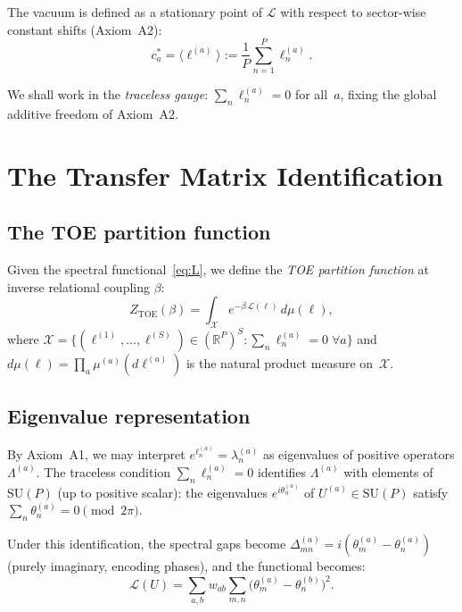 \documentclass[12pt]{article}
\theoremstyle{definition}
\theoremstyle{remark}
\newcommand{\SU}{\mathrm{SU}}
\newcommand{\TOE}{\mathrm{TOE}}
\begin{document}
The vacuum is defined as a stationary point of $\mathcal{L}$
with respect to sector-wise constant shifts (Axiom~A2):
\begin{equation}\label{eq:vacuum}
c_a^\ast = \langle \ell^{(a)} \rangle
:= \frac{1}{P}\sum_{n=1}^P \ell_n^{(a)}.
\end{equation}

We shall work in the \emph{traceless gauge}:
$\sum_n \ell_n^{(a)} = 0$ for all~$a$,
fixing the global additive freedom of Axiom~A2.

\section{The Transfer Matrix Identification}
\label{sec:identification}

\subsection{The TOE partition function}

Given the spectral functional~\eqref{eq:L}, we define the
\emph{TOE partition function} at inverse relational coupling $\beta$:
\begin{equation}\label{eq:ZTOE}
Z_\TOE(\beta)
= \int_{\mathcal{X}} e^{-\beta\,\mathcal{L}(\ell)}\,d\mu(\ell),
\end{equation}
where $\mathcal{X} = \{(\ell^{(1)},\ldots,\ell^{(S)}) \in
(\mathbb{R}^P)^S : \sum_n \ell_n^{(a)} = 0 \;\forall a\}$
and $d\mu(\ell) = \prod_a \mu^{(a)}(d\ell^{(a)})$ is the
natural product measure on~$\mathcal{X}$.

\subsection{Eigenvalue representation}

By Axiom~A1, we may interpret $e^{\ell_n^{(a)}} = \lambda_n^{(a)}$ as
eigenvalues of positive operators $\Lambda^{(a)}$.  The traceless
condition $\sum_n \ell_n^{(a)} = 0$ identifies $\Lambda^{(a)}$ with
elements of $\SU(P)$ (up to positive scalar): the eigenvalues
$e^{i\theta_n^{(a)}}$ of $U^{(a)} \in \SU(P)$ satisfy
$\sum_n \theta_n^{(a)} = 0\pmod{2\pi}$.

Under this identification, the spectral gaps become
$\Delta_{mn}^{(a)} = i(\theta_m^{(a)} - \theta_n^{(a)})$
(purely imaginary, encoding phases), and the functional becomes:
\begin{equation}\label{eq:L_group}
\mathcal{L}(U)
= \sum_{a,b} w_{ab}
  \sum_{m,n} \bigl(\theta_m^{(a)} - \theta_n^{(b)}\bigr)^2.
\end{equation}
\end{document}
